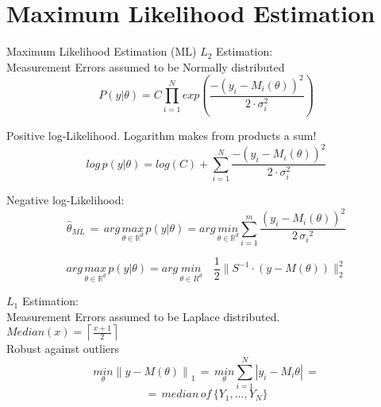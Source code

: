 \section*{Maximum Likelihood Estimation}
Maximum Likelihood Estimation (ML) \({L}_{2}\) Estimation:\\
Measurement Errors assumed to be Normally distributed
\begin{equation*}
{ P(y|\theta ) }=C\prod _{ i=1 }^{ N }{ exp(\frac { -(y_{ i }-M_{ i }(\theta ))^{ 2 } }{ 2\cdot \sigma _{ i }^{ 2 } } )} 
\end{equation*}

Positive log-Likelihood. Logarithm makes from products a sum!
\begin{equation*}
{ log \, p(y|\theta ) } = log(C) +\sum _{ i=1 }^{ N }{ { \frac { -(y_{ i }-M_{ i }(\theta ))^{ 2 } }{ 2 \cdot \sigma _{ i }^{ 2 } }  } } 
\end{equation*}

Negative log-Likelihood:
\begin{equation*}
\hat{\theta}_{ML} \, = \, arg \, \underset { \theta \in { \mathbb{R} }^{ d } }{ max } \, p(y|\theta ) = arg \, \underset { \theta \in { \mathbb{R} }^{ d } }{ min }  \sum _{ i=1 }^{ m }{ \frac { (y_{ i }-M_{ i }(\theta ))^{ 2 } }{ 2\, { \sigma _{ i } }^{ 2 } }  } 
\end{equation*}

\begin{equation*}
arg \, \underset{ \theta \in \mathbb{ R }^{ d } }{ max } \, p(y|\theta ) = arg \, \underset { \theta \in {  R }^{ d } }{ min } \quad \frac{1}{2} \parallel S^{ -1 }\cdot (y-M(\theta )){ \parallel  }_{ 2 }^{ 2 }
\end{equation*}

\({L}_{1}\) Estimation:\\
Measurement Errors assumed to be Laplace distributed.\\ \(Median(x)=\left\lceil \frac { x + 1 }{ 2 }  \right\rceil \)\\
Robust against outliers
\begin{equation*}
\underset { \theta  }{ min } { \parallel y-M(\theta )\parallel  }_{ 1 }\,=\,\underset { \theta  }{ min } \sum _{ i=1 }^{ N }{ |{ y }_{ i }-{ M }_{ i }\theta | } \,=
\end{equation*}
\begin{equation*}
=\,median\,of\,\{{Y}_{1},...,{Y}_{N}\}
\end{equation*}



